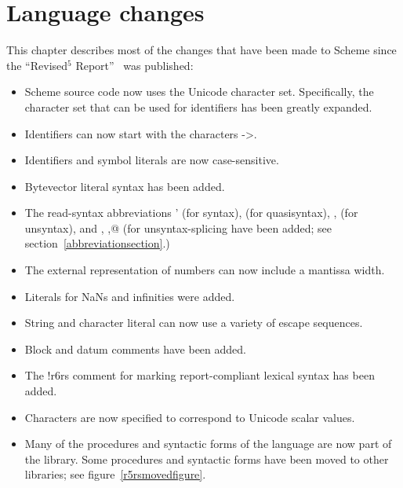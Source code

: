 \chapter{Language changes}
\label{languagechangesappendix}

This chapter describes most of the changes that have been made to
Scheme since the ``Revised$^5$ Report''~\cite{R5RS} was published:

\begin{itemize}
\item Scheme source code now uses the Unicode character set.
  Specifically, the character set that can be used for identifiers has
  been greatly expanded.
\item Identifiers can now start with the characters {\cf ->}.
\item Identifiers and symbol literals are now case-sensitive.
\item Bytevector literal syntax has been added.
\item The read-syntax abbreviations {\cf \sharpsign{}'} (for {\cf
    syntax}), {\cf \sharpsign\backquote} (for {\cf quasisyntax}), {\cf
    \sharpsign{},} (for {\cf unsyntax}), and , {\cf \sharpsign{},@}
  (for {\cf unsyntax-splicing} have been added; see section~\ref{abbreviationsection}.)
\item The external representation of numbers can now include a
  mantissa width.
\item Literals for NaNs and infinities were added.
\item String and character literal can now use a variety of escape sequences.
\item Block and datum comments have been added.
\item The {\cf !\sharpsign{}r6rs} comment for marking report-compliant
  lexical syntax has been added.
\item Characters are now specified to correspond to Unicode scalar
  values.
\item Many of the procedures and syntactic forms of the language are
  now part of the  library.  Some procedures and
  syntactic forms have been moved to other libraries; see figure~\ref{r5rsmovedfigure}.


\end{itemize}
